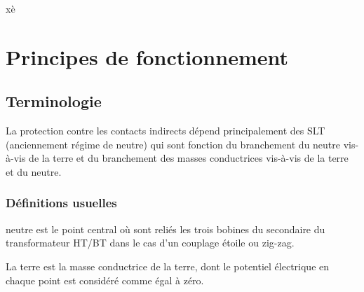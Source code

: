 xè%


\begin{comment}

\documentclass[a4paper, 11pt, twoside, fleqn]{memoir}

\usepackage{AOCDTF}



	\openleft %

\end{comment}
\chapter{Principes de fonctionnement}
\ChapFrame
 
\section{Terminologie}

La protection contre les contacts indirects dépend principalement des SLT (anciennement régime de neutre) qui sont fonction du branchement du neutre vis-à-vis de la terre et du branchement des masses conductrices vis-à-vis de la terre et du neutre.

\subsection{Définitions usuelles}

\begin{Definition}[Neutre]
 neutre est le point central où sont reliés les trois bobines du secondaire du transformateur HT/BT dans le cas d'un couplage étoile ou zig-zag.
\end{Definition}

\begin{Definition}[Terre]
La terre est la masse conductrice de la terre, dont le potentiel électrique en chaque point est considéré comme égal à zéro.
\end{Definition}

